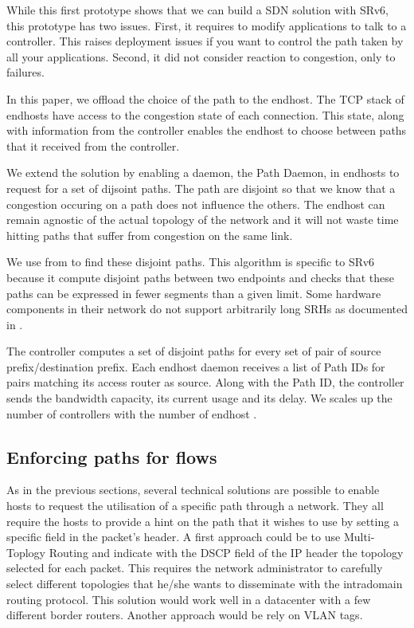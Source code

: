 While this first prototype shows that we can build a SDN solution with SRv6,
this prototype has two issues. First, it requires to modify applications to talk
to a controller. This raises deployment issues if you want to control the path taken by
all your applications. Second, it did not consider reaction to congestion, only to failures.

In this paper, we offload the choice of the path to the endhost. The TCP stack of endhosts have
access to the congestion state of each connection. This state, along with information from the
controller enables the endhost to choose between paths that it received from the controller.

We extend the solution by enabling a daemon, the Path Daemon,
in endhosts to request for a set of dijsoint paths.
The path are disjoint so that we know that a congestion occuring on a path does not influence
the others. The endhost can remain agnostic of the actual topology of the network and it
will not waste time hitting paths that suffer from congestion on the same link.

We use  from \cite{aubry2015traffic} to find these disjoint paths.
This algorithm is specific
to SRv6 because it compute disjoint paths between two endpoints and checks that these paths can be expressed
in fewer segments than a given limit. Some hardware components in their network
do not support arbitrarily long SRHs as documented in \cite{sr-hardware-segment-limit}.

The controller computes a set of disjoint paths for every set of pair of source prefix/destination prefix.
Each endhost daemon receives a list of Path IDs for pairs matching its access router as source.
Along with the Path ID, the controller sends the bandwidth capacity, its current usage and its delay.
We scales up the number of controllers with the number of endhost
.


\subsection{Enforcing paths for flows}

As in the previous sections, several technical solutions are possible to
enable hosts to request the utilisation of a specific path through a network.
They all require the hosts to provide a hint on the path that it wishes to
use by setting a specific field in the packet's header. A first
approach could be to use Multi-Toplogy Routing \cite{rfc4915} and
indicate with the DSCP field of the IP header the topology selected for
each packet. This requires the network administrator to carefully select
different topologies that he/she wants to disseminate with the intradomain
routing protocol. This solution would work well in a datacenter with a
few different border routers. Another approach would be rely on VLAN tags.

